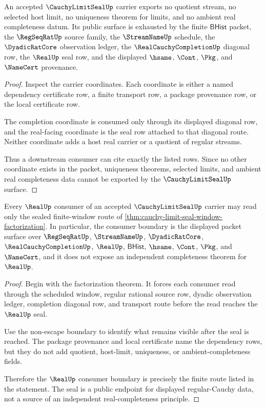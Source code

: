 \begin{theorem}
\label{thm:cauchy-limit-seal-non-escape}
An accepted $\CauchyLimitSealUp$ carrier exports no quotient stream, no selected host limit, no uniqueness theorem for limits, and no ambient real completeness datum. Its public surface is exhausted by the finite $\mathsf{BHist}$ packet, the $\RegSeqRatUp$ source family, the $\StreamNameUp$ schedule, the $\DyadicRatCore$ observation ledger, the $\RealCauchyCompletionUp$ diagonal row, the $\RealUp$ seal row, and the displayed $\hsame$, $\Cont$, $\Pkg$, and $\NameCert$ provenance.
\end{theorem}
\begin{proof}
Inspect the carrier coordinates. Each coordinate is either a named dependency certificate row, a finite transport row, a package provenance row, or the local certificate row.

The completion coordinate is consumed only through its displayed diagonal row, and the real-facing coordinate is the seal row attached to that diagonal route. Neither coordinate adds a host real carrier or a quotient of regular streams.

Thus a downstream consumer can cite exactly the listed rows. Since no other coordinate exists in the packet, uniqueness theorems, selected limits, and ambient real completeness data cannot be exported by the $\CauchyLimitSealUp$ surface.
\end{proof}

\begin{theorem}
\label{thm:cauchy-limit-seal-realup-consumer-boundary}
Every $\RealUp$ consumer of an accepted $\CauchyLimitSealUp$ carrier may read only the sealed finite-window route of \autoref{thm:cauchy-limit-seal-window-factorization}. In particular, the consumer boundary is the displayed packet surface over $\RegSeqRatUp$, $\StreamNameUp$, $\DyadicRatCore$, $\RealCauchyCompletionUp$, $\RealUp$, $\mathsf{BHist}$, $\hsame$, $\Cont$, $\Pkg$, and $\NameCert$, and it does not expose an independent completeness theorem for $\RealUp$.
\end{theorem}
\begin{proof}
Begin with the factorization theorem. It forces each consumer read through the scheduled window, regular rational source row, dyadic observation ledger, completion diagonal row, and transport route before the read reaches the $\RealUp$ seal.

Use the non-escape boundary to identify what remains visible after the seal is reached. The package provenance and local certificate name the dependency rows, but they do not add quotient, host-limit, uniqueness, or ambient-completeness fields.

Therefore the $\RealUp$ consumer boundary is precisely the finite route listed in the statement. The seal is a public endpoint for displayed regular-Cauchy data, not a source of an independent real-completeness principle.
\end{proof}

